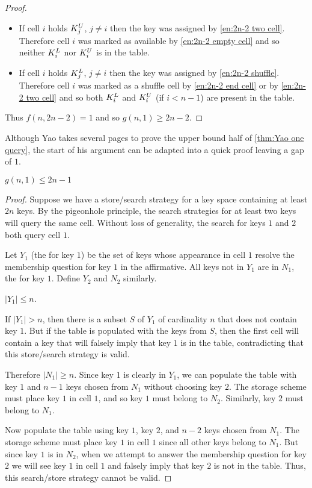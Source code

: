 \begin{proof}
\begin{itemize}
		\item If cell $i$ holds $K_{j}^{U}$, $j \neq i$ then the key was assigned by \ref{en:2n-2 two cell}. Therefore cell $i$ was marked as available by \ref{en:2n-2 empty cell} and so neither $K_{i}^{L}$ nor $K_{i}^{U}$ is in the table.
		\item If cell $i$ holds $K_{j}^{L}$, $j \neq i$ then the key was assigned by \ref{en:2n-2 shuffle}. Therefore cell $i$ was marked as a shuffle cell by \ref{en:2n-2 end cell} or by \ref{en:2n-2 two cell} and so both $K_{i}^{L}$ and $K_{i}^{U}$ (if $i < n-1$) are present in the table.
	\end{itemize}
Thus $f\left(n,2n-2\right) = 1$ and so $g\left(n,1\right) \geq 2n-2$.
\end{proof}

Although Yao takes several pages to prove the upper bound half of \autoref{thm:Yao one query}, the start of his argument can be adapted into a quick proof leaving a gap of $1$.

\begin{theorem}\label{thm:Yao minus 1}$g\left(n,1\right) \leq 2n-1$
\end{theorem}
\begin{proof}Suppose we have a store/search strategy for a key space containing at least $2n$ keys. By the pigeonhole principle, the search strategies for at least two keys will query the same cell. Without loss of generality, the search for keys $1$ and $2$ both query cell $1$.

Let $Y_1$ (the  for key $1$) be the set of keys whose appearance in cell $1$ resolve the membership question for key $1$ in the affirmative. All keys not in $Y_1$ are in $N_1$, the  for key $1$. Define $Y_2$ and $N_2$ similarly.

\begin{claim}$\left|Y_1\right| \leq n$.

If $\left|Y_1\right| > n$, then there is a subset $S$ of $Y_1$ of cardinality $n$ that does not contain key $1$. But if the table is populated with the keys from $S$, then the first cell will contain a key that will falsely imply that key $1$ is in the table, contradicting that this store/search strategy is valid.
\end{claim}

Therefore $\left|N_1\right| \geq n$. Since key $1$ is clearly in $Y_1$, we can populate the table with key $1$ and  $n-1$ keys chosen from $N_1$ without choosing key $2$. The storage scheme must place key $1$ in cell $1$, and so key $1$ must belong to $N_2$. Similarly, key $2$ must belong to $N_1$.

Now populate the table using key $1$, key $2$, and $n-2$ keys chosen from $N_1$. The storage scheme must place key $1$ in cell $1$ since all other keys belong to $N_1$. But since key $1$ is in $N_2$, when we attempt to answer the membership question for key $2$ we will see key $1$ in cell $1$ and falsely imply that key $2$ is not in the table. Thus, this search/store strategy cannot be valid.
\end{proof}

